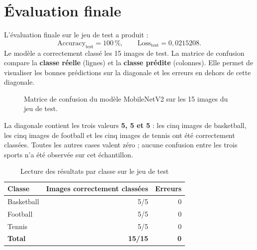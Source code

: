 \documentclass[11pt,a4paper,oneside]{report}
\begin{document}
\section{Évaluation finale}
L'évaluation finale sur le jeu de test a produit :
\begin{equation}
\mathrm{Accuracy}_{\mathrm{test}}=100\,\%,\qquad
\mathrm{Loss}_{\mathrm{test}}=0{,}0215208.
\end{equation}
Le modèle a correctement classé les 15 images de test. La matrice de confusion compare la \textbf{classe réelle} (lignes) et la \textbf{classe prédite} (colonnes). Elle permet de visualiser les bonnes prédictions sur la diagonale et les erreurs en dehors de cette diagonale.

\begin{figure}[H]
\centering
{}
\caption{Matrice de confusion du modèle MobileNetV2 sur les 15 images du jeu de test.}
\label{fig:confusion}
\end{figure}

La diagonale contient les trois valeurs \textbf{5, 5 et 5} : les cinq images de basketball, les cinq images de football et les cinq images de tennis ont été correctement classées. Toutes les autres cases valent zéro ; aucune confusion entre les trois sports n'a été observée sur cet échantillon.

\begin{table}[H]
\centering
\caption{Lecture des résultats par classe sur le jeu de test}
\begin{tabular}{lrr}
\toprule
\textbf{Classe} & \textbf{Images correctement classées} & \textbf{Erreurs}\\
\midrule
Basketball & 5/5 & 0\\
Football & 5/5 & 0\\
Tennis & 5/5 & 0\\
\midrule
\textbf{Total} & \textbf{15/15} & \textbf{0}\\
\bottomrule
\end{tabular}
\end{table}
\end{document}
